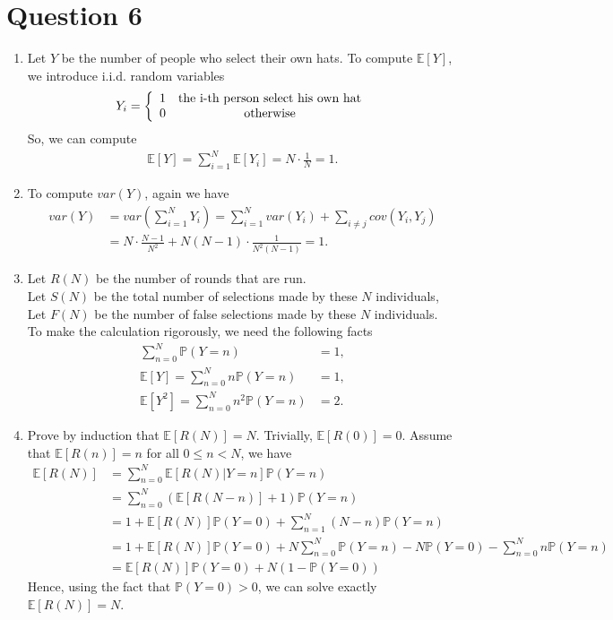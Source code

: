 \documentclass[a4paper, 11pt]{amsart}
\theoremstyle{remark}
\numberwithin{equation}{section}
\begin{document}
\clearpage

\section*{Question 6}
\begin{enumerate}
\item Let $Y$ be the number of people who select their own hats. To compute $\mathbb{E}[Y]$, we introduce i.i.d. random variables
\[ Y_i = \left\{ \begin{array}{cc}
1 & \textup{the i-th person select his own hat} \\
0 & \textup{otherwise}
\end{array} \right.\]
So, we can compute
\begin{align*}
\mathbb{E}[Y] = \sum_{i = 1}^N\mathbb{E}[Y_i] = N\cdot \frac{1}{N} = 1.
\end{align*}

\item To compute $var(Y)$, again we have
\begin{align*}
var(Y) 
&= var\left(\sum_{i = 1}^NY_i\right) = \sum_{i=1}^Nvar(Y_i) + \sum_{i\neq j}cov(Y_i, Y_j) \\
& = N\cdot\frac{N-1}{N^2} + N(N-1)\cdot\frac{1}{N^2(N-1)} = 1.
\end{align*}

\item Let $R(N)$ be the number of rounds that are run.\\
Let $S(N)$ be the total number of selections made by these $N$ individuals, \\
Let $F(N)$ be the number of false selections made by these $N$ individuals.\\
To make the calculation rigorously, we need the following facts
\begin{align*}
\sum_{n = 0}^N\mathbb{P}(Y = n) &= 1,\\
\mathbb{E}[Y] = \sum_{n=0}^Nn\mathbb{P}(Y = n) &= 1,\\
\mathbb{E}[Y^2] = \sum_{n=0}^Nn^2\mathbb{P}(Y=n) & = 2.
\end{align*}

\item Prove by induction that $\mathbb{E}[R(N)] = N$. Trivially, $\mathbb{E}[R(0)] = 0$.  Assume that $\mathbb{E}[R(n)] = n$ for all $0\leq n < N$, we have
\begin{align*}
\mathbb{E}[R(N)] 
&= \sum_{n=0}^N\mathbb{E}[R(N)|Y = n]\mathbb{P}(Y=n) \\
&= \sum_{n=0}^N\left(\mathbb{E}[R(N-n)] + 1\right)\mathbb{P}(Y=n)\\
&= 1 + \mathbb{E}[R(N)]\mathbb{P}(Y=0) + \sum_{n=1}^N\left(N-n\right)\mathbb{P}(Y=n)\\
&= 1 + \mathbb{E}[R(N)]\mathbb{P}(Y=0) + N\sum_{n=0}^N\mathbb{P}(Y=n)-N\mathbb{P}(Y=0)-\sum_{n=0}^Nn\mathbb{P}(Y=n)\\
&= \mathbb{E}[R(N)]\mathbb{P}(Y=0) + N(1-\mathbb{P}(Y=0))
\end{align*}
Hence, using the fact that $\mathbb{P}(Y = 0) >0$, we can solve exactly $\mathbb{E}[R(N)] = N$.


\end{enumerate}
\end{document}

